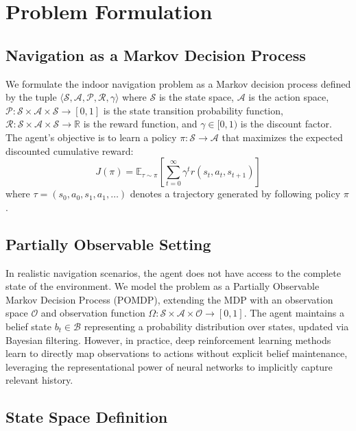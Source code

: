 \documentclass{article}
\begin{document}
\section{Problem Formulation}

\subsection{Navigation as a Markov Decision Process}

We formulate the indoor navigation problem as a Markov decision process defined
by the tuple $\langle \mathcal{S}, \mathcal{A}, \mathcal{P}, \mathcal{R},
\gamma \rangle$ where $\mathcal{S}$ is the state space, $\mathcal{A}$ is the
action space, $\mathcal{P} : \mathcal{S} \times \mathcal{A} \times \mathcal{S}
\to [0,1]$ is the state transition probability function, $\mathcal{R} :
\mathcal{S} \times \mathcal{A} \times \mathcal{S} \to \mathbb{R}$ is the reward
function, and $\gamma \in [0,1)$ is the discount factor. The agent's objective
is to learn a policy $\pi : \mathcal{S} \to \mathcal{A}$ that maximizes the
expected discounted cumulative reward:
\begin{equation}
    J(\pi) = \mathbb{E}_{\tau \sim \pi}\!\left[
    \sum_{t=0}^{\infty} \gamma^t r(s_t, a_t, s_{t+1})\right]
\end{equation}
where $\tau = (s_0, a_0, s_1, a_1, \ldots)$ denotes a trajectory generated by
following policy $\pi$.

\subsection{Partially Observable Setting}

In realistic navigation scenarios, the agent does not have access to the complete
state of the environment. We model the problem as a Partially Observable Markov
Decision Process (POMDP), extending the MDP with an observation space
$\mathcal{O}$ and observation function $\Omega : \mathcal{S} \times \mathcal{A}
\times \mathcal{O} \to [0,1]$. The agent maintains a belief state $b_t \in
\mathcal{B}$ representing a probability distribution over states, updated via
Bayesian filtering. However, in practice, deep reinforcement learning methods
learn to directly map observations to actions without explicit belief
maintenance, leveraging the representational power of neural networks to
implicitly capture relevant history.

\subsection{State Space Definition}
\end{document}
